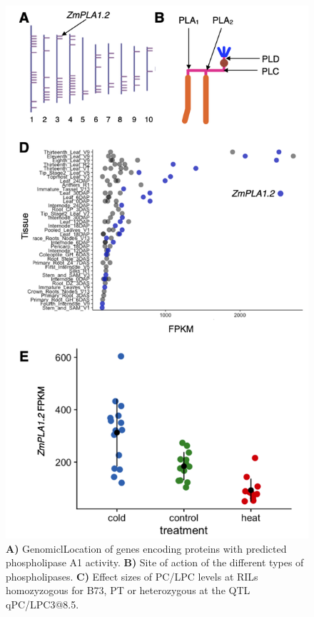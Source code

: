 \documentclass[9pt,twocolumn,twoside,lineno]{BioRxiv}
\begin{document}
\begin{figure}[t]
\begin{center}
\includegraphics[width=0.4\paperwidth]{Sup_Figures/Sup_Fig_3.png}
\caption{\textbf{A)} GenomiclLocation of genes encoding proteins with predicted phospholipase A1 activity. 
\textbf{B)} Site of action of the different types of phospholipases.
\textbf{C)} Effect sizes of PC/LPC levels at RILs homozyzogous for B73, PT or heterozygous at the QTL qPC/LPC3@8.5.
} 
\label{SupFig3}
\end{center}
\end{figure}  
\end{document}
